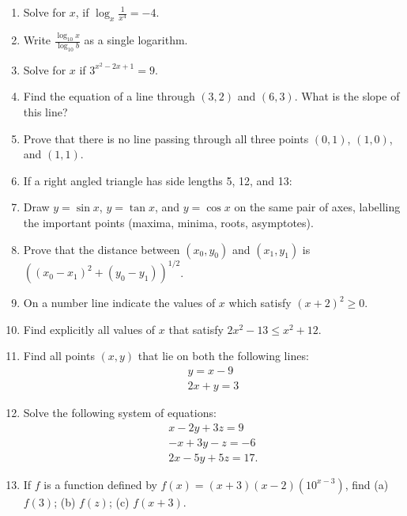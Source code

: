 \documentclass{exam}
\theoremstyle{definition}
\begin{document}
\begin{enumerate}
  \item Solve for $ x $, if $ \log_x \frac{1}{x^4} = -4 $.
  \item Write $ \frac{\log_{10} x}{\log_{10} b} $ as a single logarithm.
  \item Solve for $ x $ if $ 3^{x^2 - 2x + 1} = 9 $.
  \item Find the equation of a line through $ (3,2) $ and $ (6,3) $. What is the slope of this line?
  \item Prove that there is no line passing through all three points $ (0,1) $, $ (1,0) $, and $ (1,1) $.
  \item If a right angled triangle has side lengths 5, 12, and 13:
  \item Draw $ y = \sin x $, $ y = \tan x $, and $ y = \cos x $ on the same pair of axes, labelling the important points (maxima, minima, roots, asymptotes).
  \item Prove that the distance between $ (x_0, y_0) $ and $ (x_1, y_1) $ is $ \left((x_0 - x_1)^2 + (y_0 - y_1)\right)^{1/2} $.
  \item On a number line indicate the values of $ x $ which satisfy $ (x + 2)^2 \geq 0 $.
  \item Find explicitly all values of $ x $ that satisfy $ 2x^2 - 13 \leq x^2 + 12 $.
  \item Find all points $ (x,y) $ that lie on both the following lines:
    \begin{gather*}
      y = x - 9\\
      2x + y = 3
    \end{gather*}
  \item Solve the following system of equations:
    \begin{gather*}
      x - 2y + 3z = 9\\
      -x + 3y - z = -6\\
      2x - 5y + 5z = 17.
    \end{gather*}
  \item If $ f $ is a function defined by $ f(x) = (x + 3)(x - 2)(10^{x - 3}) $, find (a) $ f(3) $; (b) $ f(z) $; (c) $ f(x + 3) $.
\end{enumerate}
\end{document}
